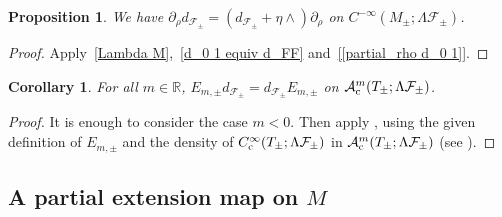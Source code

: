 \documentclass{memo-l}
\theoremstyle{plain}
\newtheorem{cor}[thm]{Corollary}
\newtheorem{prop}[thm]{Proposition}
\theoremstyle{definition}
\theoremstyle{remark}
\newtheorem{rem}[thm]{Remark}
\newcommand{\R}{\mathbb{R}}
\renewcommand{\AA}{\mathcal{A}}
\newcommand{\FF}{\mathcal{F}}
\newcommand{\co}{{\text{\rm c}}}
\newcommand{\Cinftyc}{C^\infty_{\text{\rm c}}}
\numberwithin{section}{chapter}
\numberwithin{equation}{section}%
\begin{document}
\begin{prop}\label{p: partial_rho d_FF}
We have $\partial_\rho d_{\FF_\pm}=(d_{\FF_\pm}+\eta\wedge)\partial_\rho$ on $C^{-\infty}(M_\pm;\Lambda\FF_\pm)$.
\end{prop}

\begin{proof}
Apply~\eqref{Lambda M},~\eqref{d_0 1 equiv d_FF} and~\eqref{[partial_rho d_0 1]}. 
\end{proof}


\begin{cor}\label{c: E_m pm d_FF_pm = d_FF_pm E_m pm}
For all $m\in\R$, $E_{m,\pm}d_{\FF_\pm}=d_{\FF_\pm}E_{m,\pm}$ on $\AA^m_\co(T_\pm;\Lambda\FF_\pm)$.
\end{cor}

\begin{proof}
It is enough to consider the case $m<0$. Then apply , using the given definition of $E_{m,\pm}$ and the density of $\Cinftyc(T_\pm;\Lambda\FF_\pm)$ in $\AA^m_\co(T_\pm;\Lambda\FF_\pm)$ (see ).
\end{proof}



\subsection{A partial extension map on $M$}\label{ss: E_m}
\end{document}
